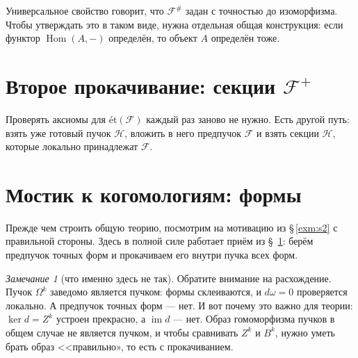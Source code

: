 \documentclass[11pt,b5paper]{article}
\newcommand{\et}{\text{ét}}
\newcommand{\Hom}{\operatorname{Hom}}
\newcommand{\Shv}[1]{\mathscr{#1}}   %
\theoremstyle{plain}
\theoremstyle{definition}
\theoremstyle{remark}
\newtheorem{reminner}[thminner]{Замечание}
\newcommand{\thmbeg}{%
  \par\smallskip
  \begin{lrbox}{\thmbox}%
  \begin{minipage}{\linewidth}}
\newcommand{\thmend}{%
  \end{minipage}%
  \end{lrbox}%
  \noindent\usebox{\thmbox}%
  \par\smallskip}
\newenvironment{rem}{\thmbeg\begin{reminner}}{\end{reminner}\thmend}
\theoremstyle{definition}
\renewcommand{\thmbeg}{\par\smallskip}
\renewcommand{\thmend}{\par\smallskip}
\let\brutsection\section
\renewcommand{\section}{\Needspace{7\baselineskip}\brutsection}
\begin{document}
Универсальное свойство говорит, что $\Shv{F}^{\#}$ задан с точностью до
изоморфизма. Чтобы утверждать это в таком виде, нужна отдельная
общая конструкция: если функтор $\Hom(A,-)$ определён, то объект $A$
определён тоже.



\section{Второе прокачивание: секции $\Shv{F}^{+}$}

\label{sec:fplus-sec}

Проверять аксиомы для $\et(\Shv{F})$ каждый раз заново не нужно.
Есть другой путь: взять уже готовый пучок $\Shv{H}$, вложить в него
предпучок $\Shv{F}$ и взять секции $\Shv{H}$, которые локально
принадлежат $\Shv{F}$.



\section{Мостик к когомологиям: формы}\label{sec:forms-bridge}

Прежде чем строить общую теорию, посмотрим на мотивацию из
\S\,\ref{exm:s2} с правильной стороны. Здесь в полной силе работает
приём из \S~\ref{sec:fplus-sec}: берём предпучок точных форм и прокачиваем
его внутри пучка всех форм.



\begin{rem}[что именно здесь не так]
Обратите внимание на расхождение. Пучок $\Omega^k$ заведомо является
пучком: формы склеиваются, и $d\omega=0$ проверяется локально. А
предпучок точных форм --- нет. И вот почему это важно для теории:
$\ker d=Z^k$ устроен прекрасно, а $\operatorname{im}d$ --- нет.
Образ гомоморфизма пучков в общем случае не является пучком, и чтобы
сравнивать $Z^k$ и $B^k$, нужно уметь брать образ <<правильно»,
то есть с прокачиванием.
\end{rem}

\end{document}
